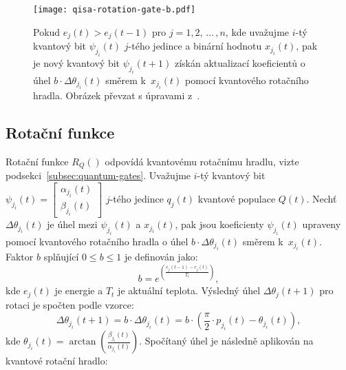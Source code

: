 \begin{figure}[ht!]
    \centering
    \texttt{[image: qisa-rotation-gate-b.pdf]}
    \caption{Pokud $e_j\left(t\right) > e_j\left(t-1\right)$ pro $j = 1,2,\,\dots\,,n$, kde uvažujme $i$-tý kvantový bit $\psi_{j_i}\left(t\right)$ $j$-tého jedince a binární hodnotu $x_{j_i} \left(t\right)$, pak je nový kvantový bit $\psi_{j_i}\left(t+1\right)$ získán aktualizací koeficientů o úhel $b \cdot \Delta\theta_{j_i}\left(t\right)$ směrem k~$x_{j_i}\left(t\right)$ pomocí kvantového rotačního hradla. Obrázek převzat s úpravami z~\cite{qisa}.}
    \label{fig:rotation-gate-b}
\end{figure}

\newpage
\subsection{Rotační funkce}\label{subsec:qisa-rot}
Rotační funkce $R_Q\left(\right)$ odpovídá kvantovému rotačnímu hradlu, vizte podsekci~\ref{subsec:quantum-gates}. 
Uvažujme $i$-tý kvantový bit $\psi_{j_i}\left(t\right) = \begin{bmatrix} \alpha_{j_i}\left(t\right) \\ \beta_{j_i}\left(t\right) \end{bmatrix}$ $j$-tého jedince $q_j\left(t\right)$ kvantové populace $Q\left(t\right)$. 
Nechť $\Delta\theta_{j_i}\left(t\right)$ je úhel mezi $\psi_{j_i}\left(t\right)$ a $x_{j_i}\left(t\right)$, pak jsou koeficienty $\psi_{j_i}\left(t\right)$ upraveny pomocí kvantového rotačního hradla o úhel $b \cdot \Delta\theta_{j_i}\left(t\right)$ směrem k~$x_{j_i}\left(t\right)$.
Faktor $b$ splňující $0 \leq b \leq 1$ je definován jako:
\begin{equation}\label{eq:b-factor}
    b = e^{\left(\frac{e_j\left(t-1\right) - e_j\left(t\right)}{T_t}\right)}, 
\end{equation}
kde $e_j\left(t\right)$ je energie a $T_t$ je aktuální teplota. Výsledný úhel $\Delta\theta_j\left(t+1\right)$ pro rotaci je spočten podle vzorce:
\begin{equation*}
        \Delta\theta_{j_i}\left(t+1\right) = b \cdot \Delta\theta_{j_i}\left(t\right) = b \cdot \left(\frac{\pi}{2}\cdot p_{j_i}\left(t\right) - \theta_{j_i}\left(t\right)\right),
\end{equation*}
kde $\theta_{j_i}\left(t\right) = \arctan{\left(\frac{\beta_{j_i}\left(t\right)}{\alpha_{j_i}\left(t\right)}\right)}$. 
Spočítaný úhel je následně aplikován na kvantové rotační hradlo:
